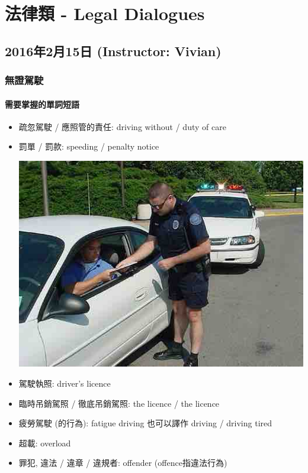 \chapter{法律類 - Legal Dialogues}
\section{2016年2月15日 (Instructor: Vivian)}
\subsection{無證駕駛}
\subsubsection*{需要掌握的單詞短語}
\begin{itemize}
  \itemsep0em
  \item 疏忽駕駛 / 應照管的責任: driving without  / duty of care
  \item 罰單 / 罰款: speeding  / penalty notice
  \begin{center}
    \includegraphics[scale=.5]{pics/speeding-ticket.jpg}
  \end{center}
  \item 駕駛執照: driver’s licence
  \item 臨時吊銷駕照 / 徹底吊銷駕照:  the licence /  the licence
  \item 疲勞駕駛 (的行為): fatigue driving 也可以譯作  driving / driving tired
  \item 超載: overload
  \item 罪犯, 違法 / 違章 / 違規者: offender (offence指違法行為)

\end{itemize}
